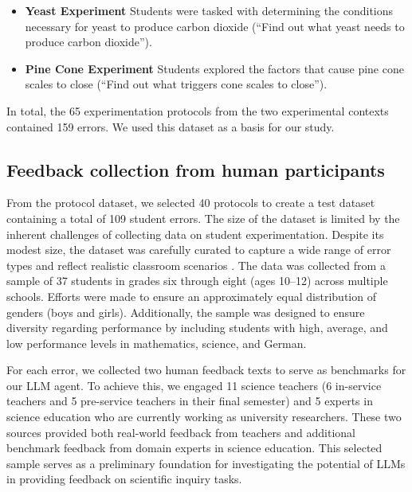 \begin{itemize}

\item \textbf{Yeast Experiment} Students were tasked with determining the conditions necessary for yeast to produce carbon dioxide (``Find out what yeast needs to produce carbon dioxide''). 

\item \textbf{Pine Cone Experiment} Students explored the factors that cause pine cone scales to close (``Find out what triggers cone scales to close''). 

\end{itemize}

In total, the 65 experimentation protocols from the two experimental contexts contained 159 errors. We used this dataset as a basis for our study.



\subsection{Feedback collection from human participants}

From the protocol dataset, we selected 40 protocols to create a test dataset containing a total of 109 student errors. The size of the dataset is limited by the inherent challenges of collecting data on student experimentation. Despite its modest size, the dataset was carefully curated to capture a wide range of error types and reflect realistic classroom scenarios \citep{baur2018fehler}. The data was collected from a sample of 37 students in grades six through eight (ages 10–12) across multiple schools. Efforts were made to ensure an approximately equal distribution of genders (boys and girls). Additionally, the sample was designed to ensure diversity regarding performance by including students with high, average, and low performance levels in mathematics, science, and German.

For each error, we collected two human feedback texts to serve as benchmarks for our LLM agent. To achieve this, we engaged 11 science teachers (6 in-service teachers and 5 pre-service teachers in their final semester) and 5 experts in science education who are currently working as university researchers. These two sources provided both real-world feedback from teachers and additional benchmark feedback from domain experts in science education. This selected sample serves as a preliminary foundation for investigating the potential of LLMs in providing feedback on scientific inquiry tasks.

